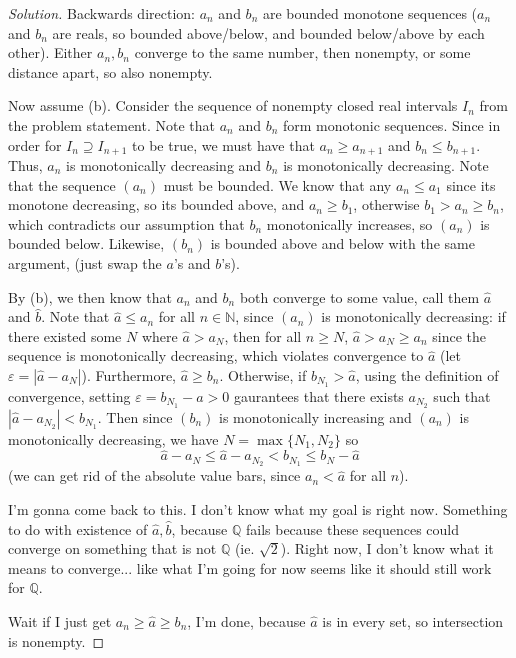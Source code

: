 \documentclass{article}
\newcommand{\N}{{\mathbb N}}
\newcommand{\Q}{{\mathbb Q}}
\newcommand{\ep}{{\varepsilon}}
\begin{document}
\begin{proof}[Solution]\let\qed\relax
	Backwards direction:
	$a_n$ and $b_n$ are bounded monotone sequences
	($a_n$ and $b_n$ are reals,
	so bounded above/below,
	and bounded below/above by each other).
	Either $a_n,b_n$ converge to the same number,
	then nonempty,
	or some distance apart, so also nonempty.

	Now assume (b).
	Consider the sequence of nonempty closed real intervals $I_n$ from the problem statement.
	Note that $a_n$ and $b_n$ form monotonic sequences.
	Since in order for $I_n \supseteq I_{n+1}$ to be true,
	we must have that $a_{n} \geq a_{n+1}$ and $b_{n} \leq b_{n+1}$.
	Thus, $a_n$ is monotonically decreasing and $b_n$ is monotonically decreasing.
	Note that the sequence $(a_n)$ must be bounded.
	We know that any $a_n \leq a_1$ since its monotone decreasing,
	so its bounded above,
	and $a_n \geq b_1$,
	otherwise $b_1 > a_n \geq b_n$,
	which contradicts our assumption that $b_n$ monotonically increases,
	so $(a_n)$ is bounded below.
	Likewise, $(b_n)$ is bounded above and below with the same argument,
	(just swap the $a$'s and $b$'s).

	By (b), we then know that $a_n$ and $b_n$ both converge to some value,
	call them $\hat{a}$ and $\hat{b}$.
	Note that $\hat{a} \leq a_n$ for all $n \in \N$,
	since $(a_n)$ is monotonically decreasing:
	if there existed some $N$ where $\hat{a} > a_N$,
	then for all $n \geq N$, $\hat{a} > a_N \geq a_n$
	since the sequence is monotonically decreasing,
	which violates convergence to $\hat{a}$
	(let $\ep = |\hat{a} - a_N|$).
	Furthermore, $\hat{a} \geq b_n$.
	Otherwise, if $b_{N_1} > \hat{a}$,
	using the definition of convergence, setting $\ep = b_{N_1} - \hat{a} > 0$
	gaurantees that there exists $a_{N_2}$ such that $|\hat{a} - a_{N_2}| < b_{N_1}$.
	Then since $(b_n)$ is monotonically increasing and $(a_n)$ is monotonically decreasing,
	we have $N = \max\{N_1,N_2\}$ so
	\[
		\hat{a} - a_N \leq \hat{a} - a_{N_2} < b_{N_1} \leq b_N - \hat{a}
	\]
	(we can get rid of the absolute value bars,
	since $a_n < \hat{a}$ for all $n$).


	I'm gonna come back to this. I don't know what my goal is right now.
	Something to do with existence of $\hat{a}, \hat{b}$,
	because $\Q$ fails because these sequences could converge
	on something that is not $\Q$ (ie. $\sqrt{2}$).
	Right now, I don't know what it means to converge...
	like what I'm going for now seems like it should still work for $\Q$.

	Wait if I just get $a_n \geq \hat{a} \geq b_n$, I'm done,
	because $\hat{a}$ is in every set,
	so intersection is nonempty.
\end{proof}
\clearpage
~\clearpage
\end{document}
